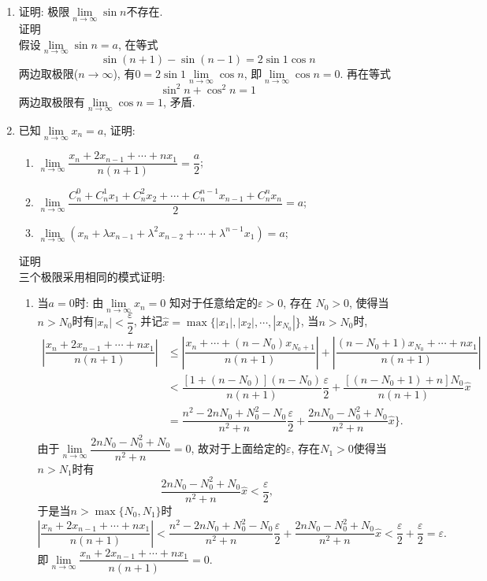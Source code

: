 \documentclass[UTF8,a4paper,20pt]{article}
\begin{document}
\begin{enumerate}
\item 证明: 极限$\lim\limits_{n\to\infty}\sin{n}$不存在.\\
{\heiti 证明}\\
假设$\lim\limits_{n\to\infty}\sin{n}=a$, 在等式
\[\sin(n+1)-\sin(n-1)=2\sin{1}\cos{n}\]
两边取极限($n\to\infty$), 有$0=2\sin{1}\lim\limits_{n\to\infty}\cos{n}$, 即$\lim\limits_{n\to\infty}\cos{n}=0$. 再在等式
\[\sin^2{n}+\cos^2{n}=1\]
两边取极限有$\lim\limits_{n\to\infty}\cos{n}=1$, 矛盾. 

\item 已知$\lim\limits_{n\to\infty}x_n=a$, 证明:
	\begin{enumerate}[(1)]
	\item $\lim\limits_{n\to\infty}\dfrac{x_n+2x_{n-1}+\cdots+nx_1}{n(n+1)}=\dfrac{a}{2}$;
	\item $\lim\limits_{n\to\infty}\dfrac{C_n^0+C_n^1x_1+C_n^2x_2+\cdots+C_n^{n-1}x_{n-1}+C_n^n x_n}{2}=a$;
	\item $\lim\limits_{n\to\infty}(x_n+\lambda x_{n-1}+ \lambda^2 x_{n-2}+\cdots+\lambda^{n-1}x_1)=a$;
	\end{enumerate}
{\heiti 证明}\\
	三个极限采用相同的模式证明:
	\begin{enumerate}[1$^{\circ}$]
	\item {\heiti 当$a=0$时:} 由$\lim\limits_{n\to\infty}x_n=0$ 知对于任意给定的$\varepsilon>0$, 存在 $N_0>0$, 使得当$n>N_0$时有$|x_n|<\dfrac{\varepsilon}{2}$, 并记$\hat{x}=\max\{|x_1|, |x_2|, \cdots, |x_{N_0}|\}$, 当$n>N_0$时,
	\begin{equation*}
	\begin{split}
	\left|\dfrac{x_n+2x_{n-1}+\cdots+nx_1}{n(n+1)}\right|&\leqslant\left|\dfrac{x_n+\cdots+(n-N_0)x_{N_0+1}}{n(n+1)}\right|+\left|\dfrac{(n-N_0+1)x_{N_0}+\cdots+nx_1}{n(n+1)}\right|\\
	&<\dfrac{[1+(n-N_0)](n-N_0)}{n(n+1)}\dfrac{\varepsilon}{2}+\dfrac{[(n-N_0+1)+n]N_0}{n(n+1)}\hat{x}\\
	&=\dfrac{n^2-2nN_0+N_0^2-N_0}{n^2+n}\dfrac{\varepsilon}{2}+\dfrac{2nN_0-N_0^2+N_0}{n^2+n}\hat{x}\}.
	\end{split}
	\end{equation*}
	由于$\lim\limits_{n\to\infty}\dfrac{2nN_0-N_0^2+N_0}{n^2+n}=0$, 故对于上面给定的$\varepsilon$, 存在$N_1>0$使得当$n>N_1$时有
\[\dfrac{2nN_0-N_0^2+N_0}{n^2+n}\hat{x}<\dfrac{\varepsilon}{2},\] 
于是当$n>\max\{N_0,N_1\}$时
	\[\left|\dfrac{x_n+2x_{n-1}+\cdots+nx_1}{n(n+1)}\right|<\dfrac{n^2-2nN_0+N_0^2-N_0}{n^2+n}\dfrac{\varepsilon}{2}+\dfrac{2nN_0-N_0^2+N_0}{n^2+n}\hat{x}<\dfrac{\varepsilon}{2}+\dfrac{\varepsilon}{2}=\varepsilon.\]
即$\lim\limits_{n\to\infty}\dfrac{x_n+2x_{n-1}+\cdots+nx_1}{n(n+1)}=0$.


\end{enumerate}
\end{enumerate}
\end{document}
